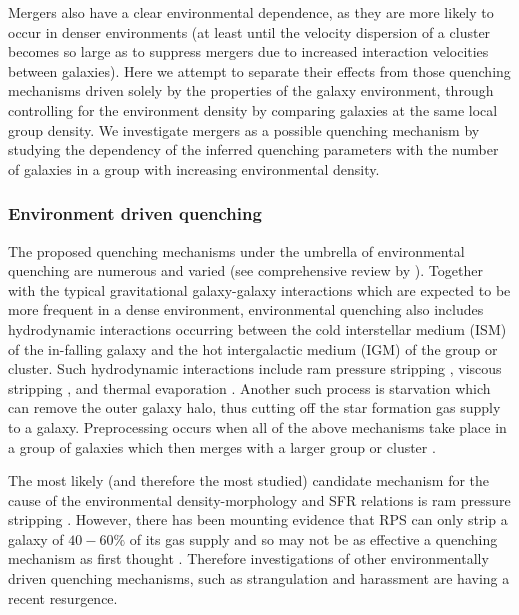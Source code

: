 \documentclass[useAMS,usenatbib]{mn2e}
\def\minor		{\color{minorcol}}
\begin{document}
Mergers also have a clear environmental dependence, as they are more likely to occur in denser environments (at least until the velocity dispersion of a cluster becomes so large as to suppress mergers due to increased interaction velocities between galaxies). {\minor Here we attempt to separate their effects from those quenching mechanisms driven solely by the properties of the galaxy environment, through controlling for the environment density by comparing galaxies at the same local group density.} We investigate mergers as a possible quenching mechanism by studying the dependency of the inferred quenching parameters with the number of galaxies in a group {\minor with increasing environmental density}. 

\subsubsection{Environment driven quenching}\label{sec:envquench}

The proposed quenching mechanisms under the umbrella of environmental quenching are numerous and varied {\minor(see comprehensive review by \citealt{boselli06})}. Together with the typical gravitational galaxy-galaxy interactions \citep{moore96} which are expected to be more frequent in a dense environment, environmental quenching also includes hydrodynamic interactions occurring between the cold interstellar medium (ISM) of the in-falling galaxy and the hot intergalactic medium (IGM) of the group or cluster. Such hydrodynamic interactions include ram pressure stripping \citep{gunngott72}, viscous stripping \citep{nulsen82}, and thermal evaporation \citep[a rapid rise in temperature of the ISM due to contact with the IGM;][]{cowie77}. Another such process is starvation \citep[also called strangulation;][]{larson80} which can remove the outer galaxy halo, thus cutting off the star formation gas supply to a galaxy. Preprocessing occurs when all of the above mechanisms take place in a group of galaxies which then merges with a larger group or cluster \citep{dressler04}. 

The most likely (and therefore the most studied) candidate mechanism for the cause of the environmental density-morphology and SFR relations is ram pressure stripping \citep[RPS;][]{abadi99, poggianti99}. However, there has been mounting evidence that RPS can only strip a galaxy of $40-60\%$ of its gas supply \citep{fillingham16} and so may not be as effective a quenching mechanism as first thought \citep{emerick16}. Therefore investigations of other environmentally driven quenching mechanisms, such as strangulation \citep{peng15, hahn16, maier16, paccagnella16, roberts16, vandevoort16} and harassment \citep[high speed galaxy `fly-by' gravitational interactions][]{bialas15, smith15b} are having a recent resurgence. 
\end{document}
